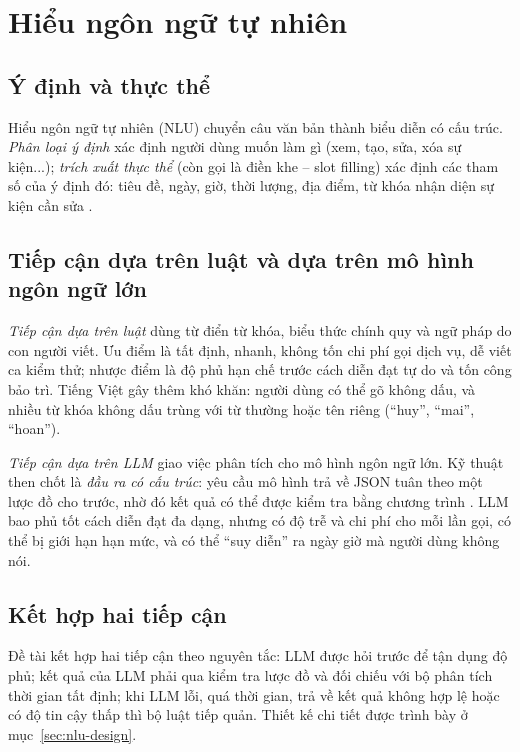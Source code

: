 \section{Hiểu ngôn ngữ tự nhiên}
\subsection{Ý định và thực thể}
Hiểu ngôn ngữ tự nhiên (NLU) chuyển câu văn bản thành biểu diễn có cấu trúc. \textit{Phân loại ý định} xác định người dùng muốn làm gì (xem, tạo, sửa, xóa sự kiện...); \textit{trích xuất thực thể} (còn gọi là điền khe – slot filling) xác định các tham số của ý định đó: tiêu đề, ngày, giờ, thời lượng, địa điểm, từ khóa nhận diện sự kiện cần sửa \cite{jurafsky}.

\subsection{Tiếp cận dựa trên luật và dựa trên mô hình ngôn ngữ lớn}
\textit{Tiếp cận dựa trên luật} dùng từ điển từ khóa, biểu thức chính quy và ngữ pháp do con người viết. Ưu điểm là tất định, nhanh, không tốn chi phí gọi dịch vụ, dễ viết ca kiểm thử; nhược điểm là độ phủ hạn chế trước cách diễn đạt tự do và tốn công bảo trì. Tiếng Việt gây thêm khó khăn: người dùng có thể gõ không dấu, và nhiều từ khóa không dấu trùng với từ thường hoặc tên riêng (“huy”, “mai”, “hoan”).

\textit{Tiếp cận dựa trên LLM} giao việc phân tích cho mô hình ngôn ngữ lớn. Kỹ thuật then chốt là \textit{đầu ra có cấu trúc}: yêu cầu mô hình trả về JSON tuân theo một lược đồ cho trước, nhờ đó kết quả có thể được kiểm tra bằng chương trình \cite{geministructured}. LLM bao phủ tốt cách diễn đạt đa dạng, nhưng có độ trễ và chi phí cho mỗi lần gọi, có thể bị giới hạn hạn mức, và có thể “suy diễn” ra ngày giờ mà người dùng không nói.

\subsection{Kết hợp hai tiếp cận}
Đề tài kết hợp hai tiếp cận theo nguyên tắc: LLM được hỏi trước để tận dụng độ phủ; kết quả của LLM phải qua kiểm tra lược đồ và đối chiếu với bộ phân tích thời gian tất định; khi LLM lỗi, quá thời gian, trả về kết quả không hợp lệ hoặc có độ tin cậy thấp thì bộ luật tiếp quản. Thiết kế chi tiết được trình bày ở mục~\ref{sec:nlu-design}.

